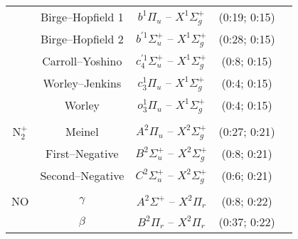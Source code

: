 \begin{center}
\begin{footnotesize}
\begin{supertabular*}{1.0\textwidth}{ccccc}
                                              & Birge--Hopfield 1                     & $b^1 \Pi_u$ -- $X^1 \Sigma_g^+$                                  & (0:19; 0:15)                               & \cite{CPR+2002} \\
                                              & Birge--Hopfield 2                     & $b^{\prime 1} \Sigma_u^+$ -- $X^1 \Sigma_g^+$       & (0:28; 0:15)                               & \cite{CPR+2002} \\
                                              & Carroll--Yoshino                      & $c^{\prime 1}_4 \Sigma_u^+$ -- $X^1 \Sigma_g^+$   & (0:8; 0:15)                               & \cite{CPR+2002} \\
                                              & Worley--Jenkins                      & $c^1_3 \Pi_u$ -- $X^1 \Sigma_g^+$                               & (0:4; 0:15)                               & \cite{CPR+2002} \\
                                              & Worley                                       & $o^1_3 \Pi_u$ -- $X^1 \Sigma_g^+$                               & (0:4; 0:15)                               & \cite{CPR+2002} \\
\\
                           N$_2^+$  & Meinel                                      & $A^2 \Pi_u$ -- $X^2 \Sigma_g^+$                                     & (0:27; 0:21)                               & \cite{CPR+2002} \\
                                              & First--Negative                        & $B^2 \Sigma_u^+$ -- $X^2 \Sigma_g^+$                        & (0:8; 0:21)                               & \cite{CPR+2002} \\
                                              & Second--Negative                 & $C^2 \Sigma_u^+$ -- $X^2 \Sigma_g^+$                        & (0:6; 0:21)                               & \cite{CPR+2002} \\
\\
                           NO             & $\gamma$                                & $A^2 \Sigma^+$ -- $X^2 \Pi_r$                                         & (0:8; 0:22)                               & \cite{CPR+2002} \\
                                              & $\beta$                                      & $B^2 \Pi_r$ -- $X^2 \Pi_r$                                                 & (0:37; 0:22)                               & \cite{CPR+2002} \\

\end{supertabular*}
\end{footnotesize}
\end{center}
